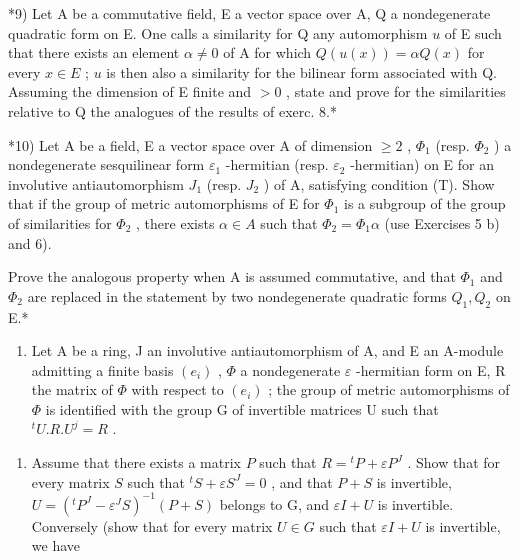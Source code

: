 *9) Let A be a commutative field, E a vector space over A, Q a nondegenerate quadratic form on E. One calls a similarity for Q any automorphism \(u\) of E such that there exists an element \(\alpha \neq 0\) of A for which \(Q(u(x)) = \alpha Q(x)\) for every \(x \in E\) ; \(u\) is then also a similarity for the bilinear form associated with Q. Assuming the dimension of E finite and \(>0\) , state and prove for the similarities relative to Q the analogues of the results of exerc. 8.*

*10) Let A be a field, E a vector space over A of dimension \(\geqslant 2\) , \(\Phi_1\) (resp. \(\Phi_2\) ) a nondegenerate sesquilinear form \(\varepsilon_1\) -hermitian (resp. \(\varepsilon_2\) -hermitian) on E for an involutive antiautomorphism \(J_1\) (resp. \(J_2\) ) of A, satisfying condition (T). Show that if the group of metric automorphisms of E for \(\Phi_1\) is a subgroup of the group of similarities for \(\Phi_2\) , there exists \(\alpha \in A\) such that \(\Phi_2 = \Phi_1\alpha\) (use Exercises 5 b) and 6).

Prove the analogous property when A is assumed commutative, and that \(\Phi_{1}\) and \(\Phi_{2}\) are replaced in the statement by two nondegenerate quadratic forms \(Q_{1}, Q_{2}\) on E.*

\begin{enumerate}
\def\labelenumi{\arabic{enumi})}
\setcounter{enumi}{10}
\tightlist
\item
  Let A be a ring, J an involutive antiautomorphism of A, and E an A-module admitting a finite basis \((e_{i})\) , \(\Phi\) a nondegenerate \(\varepsilon\) -hermitian form on E, R the matrix of \(\Phi\) with respect to \((e_{i})\) ; the group of metric automorphisms of \(\Phi\) is identified with the group G of invertible matrices U such that \(^{t}U.R.U^{j}=R\) .
\end{enumerate}

\begin{enumerate}
\def\labelenumi{\alph{enumi})}
\tightlist
\item
  Assume that there exists a matrix \(P\) such that \(R = {}^t P + \varepsilon P^J\) . Show that for every matrix \(S\) such that \({}^t S + \varepsilon S^J = 0\) , and that \(P + S\) is invertible, \(U = (^{t}P^{J} - \varepsilon^{J}S)^{-1}(P + S)\) belongs to G, and \(\varepsilon I + U\) is invertible. Conversely (show that for every matrix \(U \in G\) such that \(\varepsilon I + U\) is invertible, we have
\end{enumerate}

